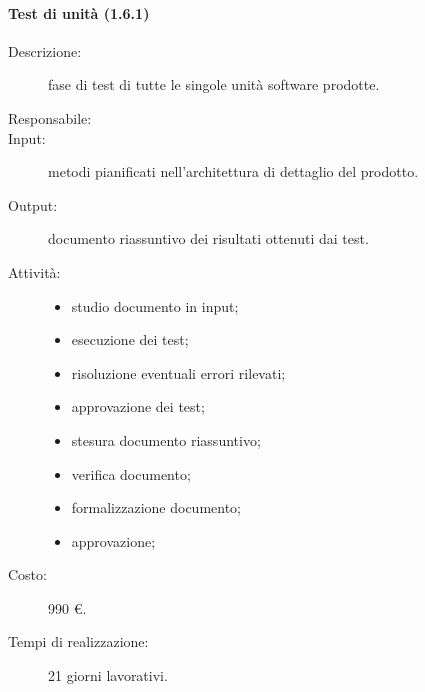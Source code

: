 \paragraph{Test di unit\`{a} (1.6.1)}
\begin{description}
\item[Descrizione:] fase di test di tutte le singole unit\`{a} software prodotte.
\item[Responsabile:] 
\item[Input:] metodi pianificati nell'architettura di dettaglio del prodotto.
\item[Output:] documento riassuntivo dei risultati ottenuti dai test.
\item[Attivit\`{a}:] 
\begin{center}
\begin{itemize}
\item studio documento in input;
\item esecuzione dei test;
\item risoluzione eventuali errori rilevati;
\item approvazione dei test;
\item stesura documento riassuntivo;
\item verifica documento;
\item formalizzazione documento;
\item approvazione;
\end{itemize}
\end{center}
\item[Costo:] 990 \euro{}.
\item[Tempi di realizzazione:] 21 giorni lavorativi.
\end{description}

